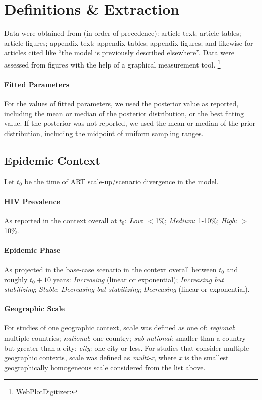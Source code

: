\section{Definitions \& Extraction}
\label{a:defs}
Data were obtained from (in order of precedence):
article text; article tables; article figures; appendix text; appendix tables; appendix figures;
and likewise for articles cited like ``the model is previously described elsewhere''.
Data were assessed from figures with the help of a graphical measurement tool.%
\footnote{WebPlotDigitizer: }
\paragraph{Fitted Parameters}
For the values of fitted parameters, we used the posterior value as reported, including
the mean or median of the posterior distribution, or the best fitting value.
If the posterior was not reported, we used the mean or median of the prior distribution,
including the midpoint of uniform sampling ranges.
\subsection{Epidemic Context}
\label{aa:defs:context}
Let $t_0$ be the time of ART scale-up/scenario divergence in the model.
\paragraph{HIV Prevalence}
As reported in the context overall at $t_0$:
\emph{Low}: {$<$1\%}; \emph{Medium}: {1-10\%}; \emph{High}: {$>$10\%}.
\paragraph{Epidemic Phase}
As projected in the base-case scenario in the context overall between $t_0$ and roughly $t_0 + 10$ years:
\emph{Increasing} (linear or exponential);
\emph{Increasing but stabilizing};
\emph{Stable};
\emph{Decreasing but stabilizing};
\emph{Decreasing} (linear or exponential).
\paragraph{Geographic Scale}
For studies of one geographic context, scale was defined as one of:
\emph{regional}: multiple countries;
\emph{national}: one country;
\emph{sub-national}: smaller than a country but greater than a city;
\emph{city}: one city or less.
For studies that consider multiple geographic contexts, scale was defined as \emph{multi-x},
where \emph{x} is the smallest geographically homogeneous scale considered
from the list above.
